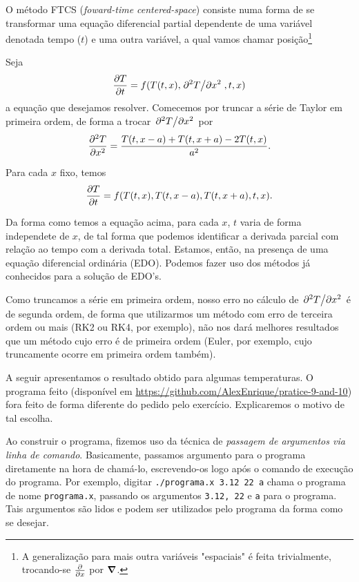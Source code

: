 




  O método FTCS (\textit{foward-time centered-space}) consiste numa forma de se transformar uma equação diferencial partial dependente de uma variável denotada tempo ($t$) e uma outra  variável, a qual vamos chamar posição\footnote{A generalização para mais outra variáveis "espaciais" é feita trivialmente, trocando-se $\pdv{x}$ por $\grad$.}

  Seja
  \begin{equation}
    \pdv{T}{t} = f(T(t,x), \pdv*[2]{T}{x}, t, x)
  \end{equation}
  a equação que desejamos resolver. Comecemos por truncar a série de Taylor em primeira ordem, de forma a trocar $\pdv*[2]{T}{x}$ por
  \begin{equation*}
    \pdv[2]{T}{x} (t, x) = \frac{T(t, x-a) + T(t, x+a) - 2T(t,x)}{a^2}.
  \end{equation*}

  Para cada $x$ fixo, temos
  \begin{equation*}
    \pdv{T}{t} (t,x) = f(T(t,x), T(t, x-a), T(t, x+a), t, x).
  \end{equation*}

  Da forma como temos a equação acima, para cada $x$, $t$ varia de forma independete de $x$, de tal forma que podemos identificar a derivada parcial com relação ao tempo com a derivada total. Estamos, então, na presença de uma equação diferencial ordinária (EDO). Podemos fazer uso dos métodos já conhecidos para a solução de EDO's.

  Como truncamos a série em primeira ordem, nosso erro no cálculo de $\pdv*[2]{T}{x}$ é de segunda ordem, de forma que utilizarmos um método com erro de terceira ordem ou mais (RK2 ou RK4, por exemplo), não nos dará melhores resultados que um método cujo erro é de primeira ordem (Euler, por exemplo, cujo truncamente ocorre em primeira ordem também).

  A seguir apresentamos o resultado obtido para algumas temperaturas. O programa feito (disponível em \url{https://github.com/AlexEnrique/pratice-9-and-10}) fora feito de forma diferente do pedido pelo exercício. Explicaremos o motivo de tal escolha.

  \newpage
  Ao construir o programa, fizemos uso da técnica de \textit{passagem de argumentos via linha de comando}. Basicamente, passamos argumento para o programa diretamente na hora de chamá-lo, escrevendo-os logo após o comando de execução do programa. Por exemplo, digitar \texttt{./programa.x 3.12 22 a} chama o programa de nome \texttt{programa.x}, passando os argumentos \texttt{3.12, 22} e \texttt{a} para o programa. Tais argumentos são lidos e podem ser utilizados pelo programa da forma como se desejar.

